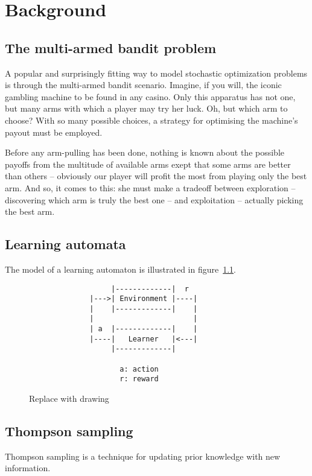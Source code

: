 \chapter{Background}
\label{ch:background}

\section{The multi-armed bandit problem}
A popular and surprisingly fitting way to model stochastic optimization problems 
is through the multi-armed bandit scenario. Imagine, if you will, the iconic 
gambling machine to be found in any casino. Only this apparatus has not one, but 
many arms with which a player may try her luck. Oh, but which arm to choose? 
With so many possible choices, a strategy for optimising the machine’s payout 
must be employed. 

Before any arm-pulling has been done, nothing is known about the possible 
payoffs from the multitude of available arms exept that some arms are better 
than others -- obviously our player will profit the most from playing only the 
best arm. And so, it comes to this: she must make a tradeoff between exploration 
-- discovering which arm is truly the best one -- and exploitation -- actually 
picking the best arm.


\section{Learning automata}
The model of a learning automaton is illustrated in figure~\ref{fig:la}.
\begin{figure}[ht]
        \begin{verbatim}
                   |-------------|  r
              |--->| Environment |----|
              |    |-------------|    |
              |                       | 
              | a  |-------------|    |
              |----|   Learner   |<---|
                   |-------------|
         
                     a: action
                     r: reward
        \end{verbatim}
        \label{fig:la}
    \caption{Replace with drawing}
\end{figure}

\section{Thompson sampling}
Thompson sampling is a technique for updating prior knowledge with new 
information.

